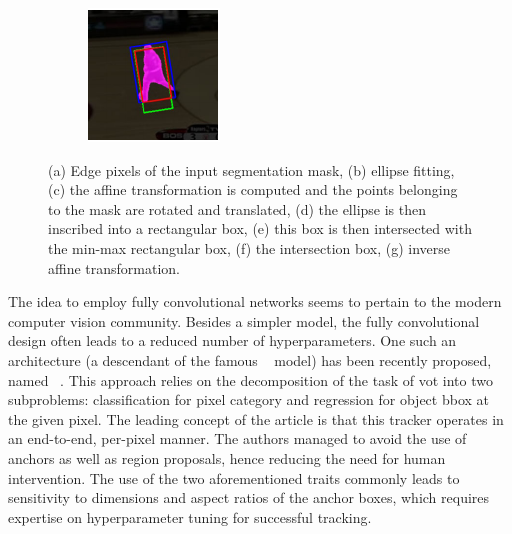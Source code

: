 \begin{figure}[t]
\begin{subfigure}[b]{0.135\textwidth}
        \caption[]{}
    \end{subfigure}
    \hfill
    \begin{subfigure}[b]{0.135\textwidth}
        \centering
        \includegraphics[width=\textwidth]{figures/theoretical_foundations/fast_vot_rot_bbox_algo_07.pdf}
        \caption[]{}
    \end{subfigure}
    \caption[Rotated \gls{bbox} by ellipse fitting]{(a) Edge pixels of the input segmentation mask, (b) ellipse fitting, (c) the affine transformation is computed and the points belonging to the mask are rotated and translated, (d) the ellipse is then inscribed into a rectangular box, (e) this box is then intersected with the min-max rectangular box, (f) the intersection box, (g) inverse affine transformation. }
    \label{fig:FastVOTRotBBOXFitting}
\end{figure}

The idea to employ fully convolutional networks seems to pertain to the modern computer vision community. Besides a simpler model, the fully convolutional design often leads to a reduced number of hyperparameters. One such an architecture (a descendant of the famous ~\cite{Bertinetto2016} model) has been recently proposed, named ~\cite{Guo2019}. This approach relies on the decomposition of the task of \gls{vot} into two subproblems: classification for pixel category and regression for object \gls{bbox} at the given pixel. The leading concept of the article is that this tracker operates in an end-to-end, per-pixel manner. The authors managed to avoid the use of anchors as well as region proposals, hence reducing the need for human intervention. The use of the two aforementioned traits commonly leads to sensitivity to dimensions and aspect ratios of the anchor boxes, which requires expertise on hyperparameter tuning for successful tracking.

